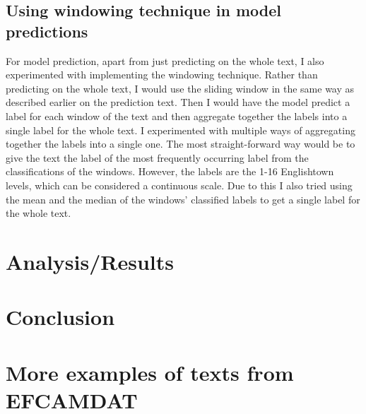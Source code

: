 \documentclass[11pt,a4paper]{article}
\begin{document}
\subsection{Using windowing technique in model predictions}

For model prediction, apart from just predicting on the whole text, I also
experimented with implementing the windowing technique. Rather than predicting
on the whole text, I would use the sliding window in the same way as described
earlier on the prediction text. Then I would have the model predict a label for
each window of the text and then aggregate together the labels into a single label
for the whole text. I experimented with multiple ways of aggregating together the
labels into a single one. The most straight-forward way would be to give the
text the label of the most frequently occurring label from the classifications
of the windows. However, the labels are the 1-16 Englishtown levels, which can
be considered a continuous scale. Due to this I also tried using the mean and
the median of the windows' classified labels to get a single label for the
whole text.

\section{Analysis/Results}



\section{Conclusion}

\printbibliography

\appendix

\section{More examples of texts from EFCAMDAT}
\end{document}
